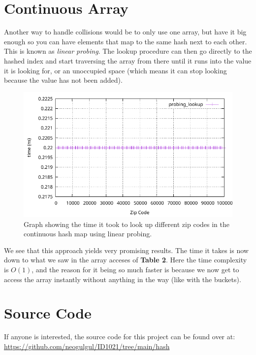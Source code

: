 \documentclass[a4paper, 11pt]{article}
\begin{document}
\section{Continuous Array}
	Another way to handle collisions would be to only use one array, but have it big enough so you can have elements that map to the same hash next to each other.
	This is known as \textit{linear probing}.
	The lookup procedure can then go directly to the hashed index and start traversing the array from there until it runs into the value it is looking for,
	or an unoccupied space (which means it can stop looking because the value has not been added).
	\begin{figure}[H]
		\centering
		\includegraphics[scale=0.8]{graphs/probing_lookup.pdf}
		\caption{
			Graph showing the time it took to look up different zip codes in the continuous hash map using linear probing.
		}
	\end{figure}
	We see that this approach yields very promising results.
	The time it takes is now down to what we saw in the array acceses of \textbf{Table 2}.
	Here the time complexity is \(O(1)\), and the reason for it being so much faster is because we now get to access the array instantly without anything in the way (like with the buckets).

\section{Source Code}
	If anyone is interested, the source code for this project can be found over at:
	\url{https://github.com/neogulgul/ID1021/tree/main/hash}
\end{document}
